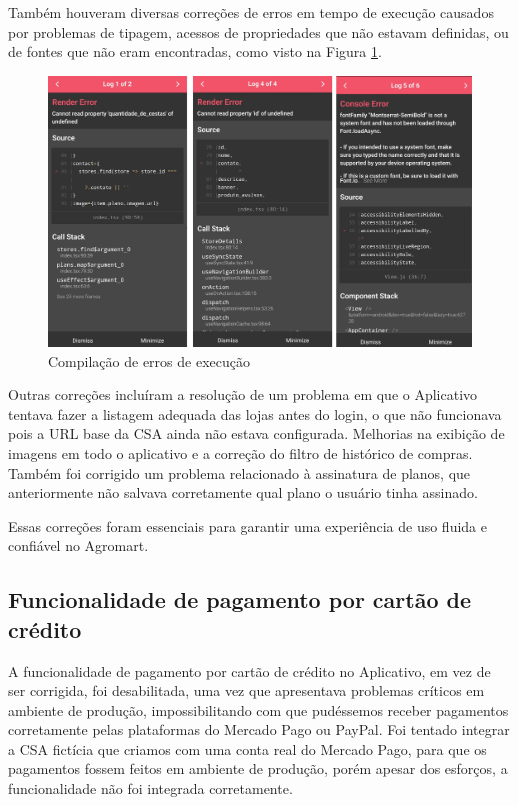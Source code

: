 Também houveram diversas correções de erros em tempo de execução causados por problemas de tipagem, acessos de propriedades que não estavam definidas, ou de fontes que não eram encontradas, como visto na Figura \ref{erros}.

\begin{figure}[h]
	\centering
	\includegraphics[keepaspectratio=true,scale=0.2]{figuras/erros.png}
	\caption{Compilação de erros de execução}
	\label{erros}
\end{figure}

Outras correções incluíram a resolução de um problema em que o Aplicativo tentava fazer a listagem adequada das lojas antes do login, o que não funcionava pois a URL base da CSA ainda não estava configurada. Melhorias na exibição de imagens em todo o aplicativo e a correção do filtro de histórico de compras. Também foi corrigido um problema relacionado à assinatura de planos, que anteriormente não salvava corretamente qual plano o usuário tinha assinado.

Essas correções foram essenciais para garantir uma experiência de uso fluida e confiável no Agromart.

\subsection{Funcionalidade de pagamento por cartão de crédito}
A funcionalidade de pagamento por cartão de crédito no Aplicativo, em vez de ser corrigida, foi desabilitada, uma vez que apresentava problemas críticos em ambiente de produção, impossibilitando com que pudéssemos receber pagamentos corretamente pelas plataformas do Mercado Pago ou PayPal. Foi tentado integrar a CSA fictícia que criamos com uma conta real do Mercado Pago, para que os pagamentos fossem feitos em ambiente de produção, porém apesar dos esforços, a funcionalidade não foi integrada corretamente.

